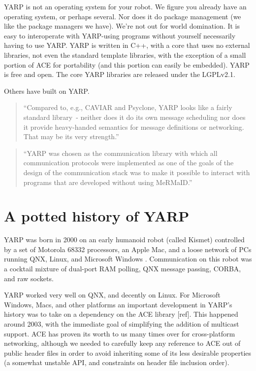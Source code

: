 \documentclass[letterpaper]{article}
\begin{document}
YARP is not an operating system for your robot. We figure you already
have an operating system, or perhaps several. Nor does it do package
management (we like the package managers we have). We're not out for
world domination. It is easy to interoperate with YARP-using programs
without yourself necessarily having to use YARP. 
YARP is written in C++, with a core that uses
no external libraries, not even the standard template libraries, with
the exception of a small portion of ACE for portability (and this
portion can easily be embedded). YARP is free and open.  The
core YARP libraries are released under the LGPLv2.1.

Others have built on YARP.

\begin{quote}
``Compared to, e.g., CAVIAR and Psyclone, YARP
looks like a fairly standard library~- neither does it
do its own message scheduling nor does it provide
heavy-handed semantics for message definitions or
networking. That may be its very strength.'' \cite{stefansson09yarp}
\end{quote}

\begin{quote}
``YARP was chosen as the communication library with
which all communication protocols were implemented as
one of the goals of the design of the communication stack
was to make it possible to interact with programs that are
developed without using MeRMaID.'' \cite{barbosa09mermaid}
\end{quote}

\section{A potted history of YARP}

YARP was born in 2000 on an early humanoid robot (called Kismet)
controlled by a set of Motorola 68332 processors, an Apple Mac, and a
loose network of PCs running QNX, Linux, and Microsoft Windows
\cite{metta06yarp}.  Communication on this robot was a cocktail
mixture of dual-port RAM polling, QNX message passing, CORBA, and raw
sockets.

YARP worked very well on QNX, and decently on Linux.  For Microsoft
Windows, Macs, and other platforms an important development in YARP's
history was to take on a dependency on the ACE library [ref].  This
happened around 2003, with the immediate goal of simplifying the
addition of multicast support.  ACE has proven its worth to us many
times over for cross-platform networking, although we needed
to carefully keep any reference to ACE out of public header files
in order to avoid inheriting some of its less desirable properties
(a somewhat unstable API, and constraints on header file inclusion
order).
\end{document}
